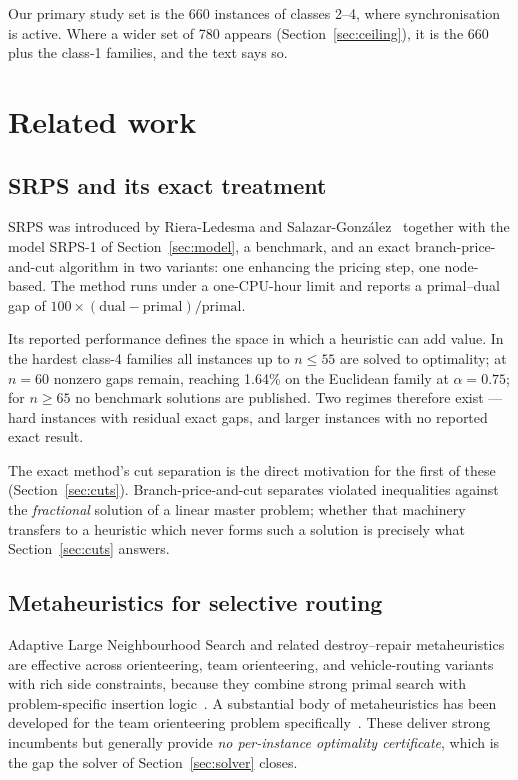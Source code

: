\documentclass[11pt,a4paper]{article}
\begin{document}
Our primary study set is the 660 instances of classes 2--4, where synchronisation
is active. Where a wider set of 780 appears (Section~\ref{sec:ceiling}), it is the
660 plus the class-1 families, and the text says so.

\section{Related work}\label{sec:related}

\subsection{SRPS and its exact treatment}

SRPS was introduced by Riera-Ledesma and
Salazar-Gonz\'alez~\cite{RieraLedesma2021SRPS} together with the model SRPS-1 of
Section~\ref{sec:model}, a benchmark, and an exact branch-price-and-cut algorithm
in two variants: one enhancing the pricing step, one node-based. The method runs
under a one-CPU-hour limit and reports a primal--dual gap of
$100\times(\text{dual}-\text{primal})/\text{primal}$.

Its reported performance defines the space in which a heuristic can add value. In
the hardest class-4 families all instances up to $n\le 55$ are solved to
optimality; at $n=60$ nonzero gaps remain, reaching 1.64\% on the Euclidean family
at $\alpha=0.75$; for $n\ge 65$ no benchmark solutions are published. Two regimes
therefore exist --- hard instances with residual exact gaps, and larger instances
with no reported exact result.

The exact method's cut separation is the direct motivation for the first of
these (Section~\ref{sec:cuts}).
Branch-price-and-cut separates violated inequalities against the \emph{fractional}
solution of a linear master problem; whether that machinery transfers to a
heuristic which never forms such a solution is precisely what
Section~\ref{sec:cuts} answers.

\subsection{Metaheuristics for selective routing}

Adaptive Large Neighbourhood Search and related destroy--repair metaheuristics are
effective across orienteering, team orienteering, and vehicle-routing variants
with rich side constraints, because they combine strong primal search with
problem-specific insertion
logic~\cite{RopkePisinger2006ALNS,Vansteenwegen2011Orienteering}. A substantial
body of metaheuristics has been developed for the team orienteering problem
specifically~\cite{Archetti2007MetaheuristicsTOP}. These deliver strong incumbents
but generally provide \emph{no per-instance optimality certificate}, which is the
gap the solver of Section~\ref{sec:solver} closes.
\end{document}
